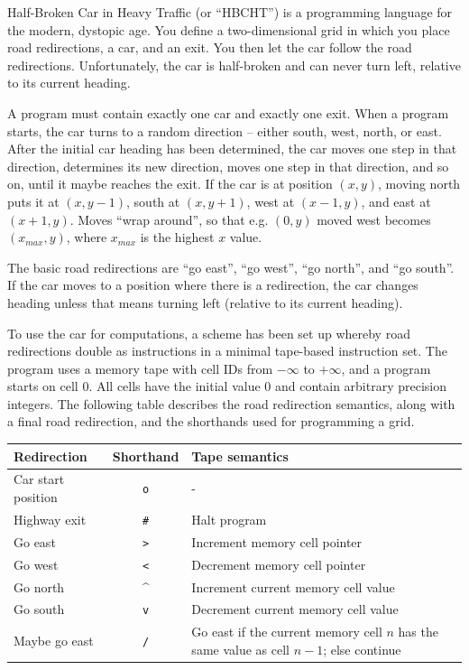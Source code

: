 Half-Broken Car in Heavy Traffic (or ``HBCHT'') is a programming language for
the modern, dystopic age.  You define a two-dimensional grid in which you place
road redirections, a car, and an exit.  You then let the car follow the road
redirections.  Unfortunately, the car is half-broken and can never turn left,
relative to its current heading.

A program must contain exactly one car and exactly one exit.  When a program
starts, the car turns to a random direction -- either south, west, north, or
east.  After the initial car heading has been determined, the car moves one step
in that direction, determines its new direction, moves one step in that
direction, and so on, until it maybe reaches the exit.  If the car is at
position $(x, y)$, moving north puts it at $(x, y - 1)$, south at $(x, y + 1)$,
west at $(x - 1, y)$, and east at $(x + 1, y)$.  Moves ``wrap around'', so that
e.g. $(0, y)$ moved west becomes $(x_{max}, y)$, where $x_{max}$ is the highest
$x$ value.

The basic road redirections are ``go east'', ``go west'', ``go north'', and ``go
south''.  If the car moves to a position where there is a redirection, the car
changes heading unless that means turning left (relative to its current
heading).

To use the car for computations, a scheme has been set up whereby road
redirections double as instructions in a minimal tape-based instruction set.
The program uses a memory tape with cell IDs from $-\infty$ to $+\infty$, and a
program starts on cell $0$.  All cells have the initial value $0$ and contain
arbitrary precision integers.  The following table describes the road
redirection semantics, along with a final road redirection, and the shorthands
used for programming a grid.

{
\scriptsize
\begin{center}
\begin{tabular}{l|c|p{4cm}}
Redirection & Shorthand & Tape semantics\\\hline
Car start position & \texttt{o} & -\\
Highway exit & \texttt{\#} & Halt program\\
Go east & \texttt{>} & Increment memory cell pointer\\
Go west & \texttt{<} & Decrement memory cell pointer\\
Go north & \textasciicircum & Increment current memory cell value\\
Go south & \texttt{v} & Decrement current memory cell value\\
Maybe go east & \texttt{/} & Go east if the current memory cell $n$ has the same value as
cell $n - 1$; else continue
\end{tabular}
\end{center}
}

